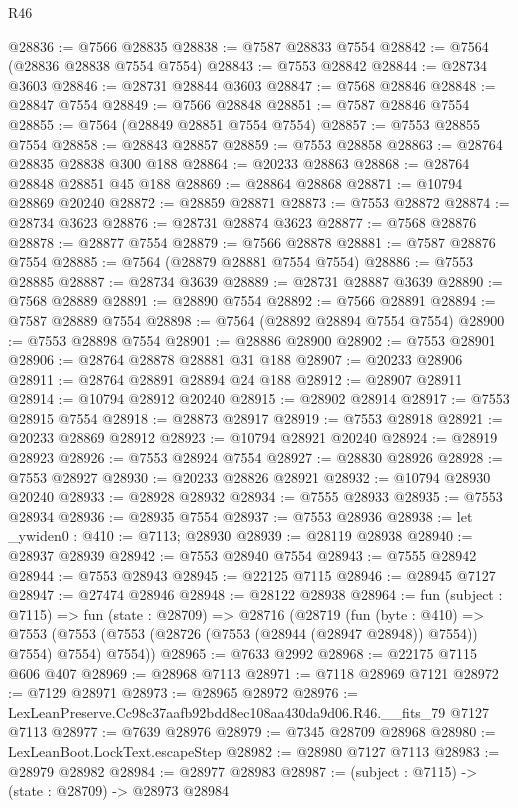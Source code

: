 \begin{lexlean}{R46}
\begin{coremodule}
@28836 := @7566 @28835
@28838 := @7587 @28833 @7554
@28842 := @7564 (@28836 @28838 @7554 @7554)
@28843 := @7553 @28842
@28844 := @28734 @3603
@28846 := @28731 @28844 @3603
@28847 := @7568 @28846
@28848 := @28847 @7554
@28849 := @7566 @28848
@28851 := @7587 @28846 @7554
@28855 := @7564 (@28849 @28851 @7554 @7554)
@28857 := @7553 @28855 @7554
@28858 := @28843 @28857
@28859 := @7553 @28858
@28863 := @28764 @28835 @28838 @300 @188
@28864 := @20233 @28863
@28868 := @28764 @28848 @28851 @45 @188
@28869 := @28864 @28868
@28871 := @10794 @28869 @20240
@28872 := @28859 @28871
@28873 := @7553 @28872
@28874 := @28734 @3623
@28876 := @28731 @28874 @3623
@28877 := @7568 @28876
@28878 := @28877 @7554
@28879 := @7566 @28878
@28881 := @7587 @28876 @7554
@28885 := @7564 (@28879 @28881 @7554 @7554)
@28886 := @7553 @28885
@28887 := @28734 @3639
@28889 := @28731 @28887 @3639
@28890 := @7568 @28889
@28891 := @28890 @7554
@28892 := @7566 @28891
@28894 := @7587 @28889 @7554
@28898 := @7564 (@28892 @28894 @7554 @7554)
@28900 := @7553 @28898 @7554
@28901 := @28886 @28900
@28902 := @7553 @28901
@28906 := @28764 @28878 @28881 @31 @188
@28907 := @20233 @28906
@28911 := @28764 @28891 @28894 @24 @188
@28912 := @28907 @28911
@28914 := @10794 @28912 @20240
@28915 := @28902 @28914
@28917 := @7553 @28915 @7554
@28918 := @28873 @28917
@28919 := @7553 @28918
@28921 := @20233 @28869 @28912
@28923 := @10794 @28921 @20240
@28924 := @28919 @28923
@28926 := @7553 @28924 @7554
@28927 := @28830 @28926
@28928 := @7553 @28927
@28930 := @20233 @28826 @28921
@28932 := @10794 @28930 @20240
@28933 := @28928 @28932
@28934 := @7555 @28933
@28935 := @7553 @28934
@28936 := @28935 @7554
@28937 := @7553 @28936
@28938 := let _ywiden0 : @410 := @7113; @28930
@28939 := @28119 @28938
@28940 := @28937 @28939
@28942 := @7553 @28940 @7554
@28943 := @7555 @28942
@28944 := @7553 @28943
@28945 := @22125 @7115
@28946 := @28945 @7127
@28947 := @27474 @28946
@28948 := @28122 @28938
@28964 := fun (subject : @7115) =>
  fun (state : @28709) =>
  @28716
    (@28719
      (fun (byte : @410) =>
      @7553 (@7553 (@7553 (@28726 (@7553 (@28944 (@28947 @28948)) @7554)) @7554) @7554) @7554))
@28965 := @7633 @2992
@28968 := @22175 @7115 @606 @407
@28969 := @28968 @7113
@28971 := @7118 @28969 @7121
@28972 := @7129 @28971
@28973 := @28965 @28972
@28976 := LexLeanPreserve.Cc98c37aafb92bdd8ec108aa430da9d06.R46.__fits_79 @7127 @7113
@28977 := @7639 @28976
@28979 := @7345 @28709 @28968
@28980 := LexLeanBoot.LockText.escapeStep
@28982 := @28980 @7127 @7113
@28983 := @28979 @28982
@28984 := @28977 @28983
@28987 := (subject : @7115) -> (state : @28709) -> @28973 @28984

\end{coremodule}
\end{lexlean}
